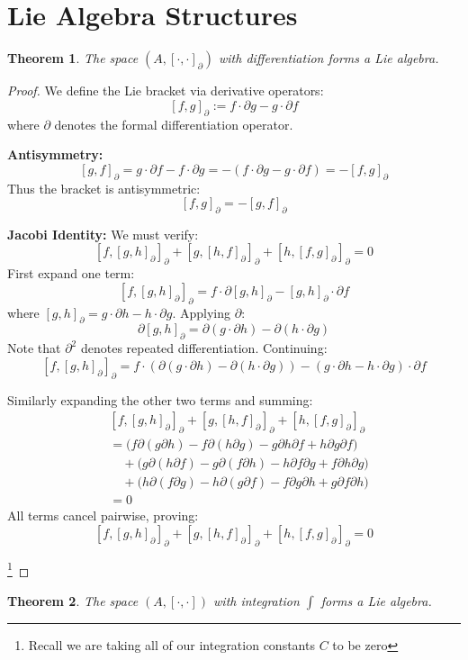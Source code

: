 \documentclass[10pt, oneside]{article}
\newtheorem{thm}{Theorem}
\begin{document}
\section{Lie Algebra Structures}
   \begin{thm}
The space $(A, [\cdot,\cdot]_\partial)$ with differentiation forms a Lie algebra.
\end{thm}
\begin{proof}
We define the Lie bracket via derivative operators:
\[
[f,g]_\partial := f \cdot \partial g - g \cdot \partial f 
\]
where $\partial$ denotes the formal differentiation operator.

\noindent\textbf{Antisymmetry:}
\[
[g,f]_\partial = g \cdot \partial f - f \cdot \partial g = - (f \cdot \partial g - g \cdot \partial f) = -[f,g]_\partial
\]
Thus the bracket is antisymmetric:
\[
\boxed{[f,g]_\partial = -[g,f]_\partial}
\]

\noindent\textbf{Jacobi Identity:}
We must verify:
\[
[f,[g,h]_\partial]_\partial + [g,[h,f]_\partial]_\partial + [h,[f,g]_\partial]_\partial = 0
\]
First expand one term:
\[
[f,[g,h]_\partial]_\partial = f \cdot \partial[g,h]_\partial - [g,h]_\partial \cdot \partial f
\]
where $[g,h]_\partial = g \cdot \partial h - h \cdot \partial g$. Applying $\partial$:
\[
\partial[g,h]_\partial = \partial(g \cdot \partial h) - \partial(h \cdot \partial g)
\]
Note that $\partial^2$ denotes repeated differentiation. Continuing:
\[
[f,[g,h]_\partial]_\partial = f \cdot (\partial(g \cdot \partial h) - \partial(h \cdot \partial g)) - (g \cdot \partial h - h \cdot \partial g) \cdot \partial f
\]

Similarly expanding the other two terms and summing:
\[
\begin{aligned}
&[f,[g,h]_\partial]_\partial + [g,[h,f]_\partial]_\partial + [h,[f,g]_\partial]_\partial \\
&= \big(f \partial(g \partial h) - f \partial(h \partial g) - g \partial h \partial f + h \partial g \partial f\big) \\
&\quad + \big(g \partial(h \partial f) - g \partial(f \partial h) - h \partial f \partial g + f \partial h \partial g\big) \\
&\quad + \big(h \partial(f \partial g) - h \partial(g \partial f) - f \partial g \partial h + g \partial f \partial h\big) \\
&= 0
\end{aligned}
\]
All terms cancel pairwise, proving:
\[
\boxed{[f,[g,h]_\partial]_\partial + [g,[h,f]_\partial]_\partial + [h,[f,g]_\partial]_\partial = 0}
\]

\footnote{Recall we are taking all of our integration constants $C$ to be zero}
\end{proof}
\begin{thm}
The space $(A, [\cdot,\cdot])$ with integration $\int$ forms a Lie algebra.
\end{thm}
\end{document}
